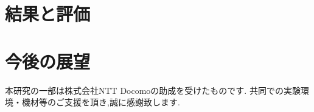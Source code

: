 \documentclass[technicalreport]{ieicej}
\begin{document}
\section{結果と評価}

\section{今後の展望}

\ack %
本研究の一部は株式会社NTT Docomoの助成を受けたものです.
共同での実験環境・機材等のご支援を頂き,誠に感謝致します.

%
%
\begin{thebibliography}{99}%
\bibitem{}
\end{thebibliography}

\appendix
\section{}

\begin{biography}
\profile{}{}{}
\end{biography}
\end{document}
